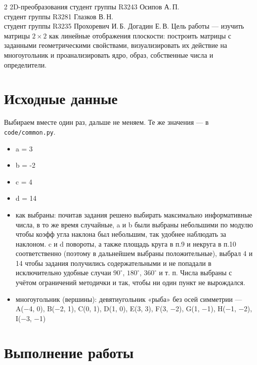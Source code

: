 \documentclass[a4paper,14pt]{extarticle}
\providecommand{\tightlist}{\setlength{\itemsep}{0pt}\setlength{\parskip}{0pt}}
\begin{document}
\makegosttitle
  {2}
  {2D-преобразования}
  {студент группы R3243 Осипов А.\,П.\\[4pt]
   студент группы R3281 Глазков В.\,Н.\\[4pt]
   студент группы R3235 Прохоревич И.\,Б.}
  {Догадин Е.\,В.}
\tableofcontents
\newpage
{}
Цель работы --- изучить матрицы $2\times 2$ как линейные отображения плоскости: построить матрицы с заданными геометрическими свойствами, визуализировать их действие на многоугольник и проанализировать ядро, образ, собственные числа и определители.

\hypertarget{ux438ux441ux445ux43eux434ux43dux44bux435-ux434ux430ux43dux43dux44bux435}{%
\section{Исходные
данные}\label{ux438ux441ux445ux43eux434ux43dux44bux435-ux434ux430ux43dux43dux44bux435}}

Выбираем вместе один раз, дальше не меняем. Те же значения --- в
\texttt{code/common.py}.

\begin{itemize}
\tightlist
\item
  a = 3
\item
  b = -2
\item
  c = 4
\item
  d = 14
\item
  как выбраны: почитав задания решено выбирать максимально информативные
  числа, в то же время случайные, a и b были выбраны небольшими по
  модулю чтобы коэфф угла наклона был небольшим, так удобнее наблюдать
  за наклоном. c и d повороты, а также площадь круга в п.9 и некруга в
  п.10 соответственно (поэтому в дальнейшем выбраны положительные),
  выбрал 4 и 14 чтобы задания получились содержательными и не попадали в
  исключительно удобные случаи \(90^\circ\), \(180^\circ\),
  \(360^\circ\) и т. п. Числа выбраны с учётом ограничений методички и
  так, чтобы ни один пункт не вырождался.
\item
  многоугольник (вершины): девятиугольник «рыба» без осей симметрии ---
  A(−4, 0), B(−2, 1), C(0, 1), D(1, 0), E(3, 3), F(3, −2), G(1, −1),
  H(−1, −2), I(−3, −1)
\end{itemize}

\hypertarget{ux432ux44bux43fux43eux43bux43dux435ux43dux438ux435-ux440ux430ux431ux43eux442ux44b}{%
\section{Выполнение
работы}\label{ux432ux44bux43fux43eux43bux43dux435ux43dux438ux435-ux440ux430ux431ux43eux442ux44b}}
\end{document}
